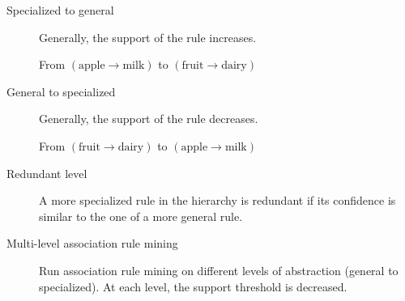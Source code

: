 \begin{description}
    \item[Specialized to general]  
        Generally, the support of the rule increases.
        \begin{example}
            From $(\text{apple} \rightarrow \text{milk})$ to $(\text{fruit} \rightarrow \text{dairy})$
        \end{example}

    \item[General to specialized]  
        Generally, the support of the rule decreases.
        \begin{example}
            From $(\text{fruit} \rightarrow \text{dairy})$ to $(\text{apple} \rightarrow \text{milk})$
        \end{example}

    \item[Redundant level] 
        A more specialized rule in the hierarchy is redundant if its confidence is similar to the one of a more general rule.

    \item[Multi-level association rule mining] 
        Run association rule mining on different levels of abstraction (general to specialized).
        At each level, the support threshold is decreased.
\end{description}